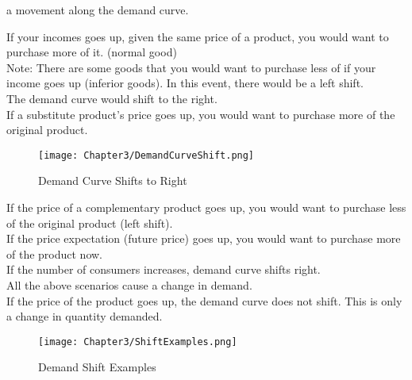a movement along the demand curve.
\begin{example}
    If your incomes goes up, given the same price of a product, you would want to purchase more of it. (normal good)\\
    Note: There are some goods that you would want to purchase less of if your income goes up (inferior goods). In this event, there would be a left shift.\\
    The demand curve would shift to the right.\\ If a substitute product's price goes up, 
    you would want to purchase more of the original product.
    \begin{figure}[H]
        \centering
        \texttt{[image: Chapter3/DemandCurveShift.png]}
        \caption{Demand Curve Shifts to Right}
    \end{figure}
    If the price of a complementary product goes up, you would want to purchase less of the original product (left shift).\\
    If the price expectation (future price) goes up, you would want to purchase more of the product now.\\
    If the number of consumers increases, demand curve shifts right.\\
    All the above scenarios cause a change in demand.\\
    If the price of the product goes up, the demand curve does not shift. This is only a change in quantity demanded.
\end{example}
\begin{figure}[H]
    \centering
    \texttt{[image: Chapter3/ShiftExamples.png]}
    \caption{Demand Shift Examples}
\end{figure}